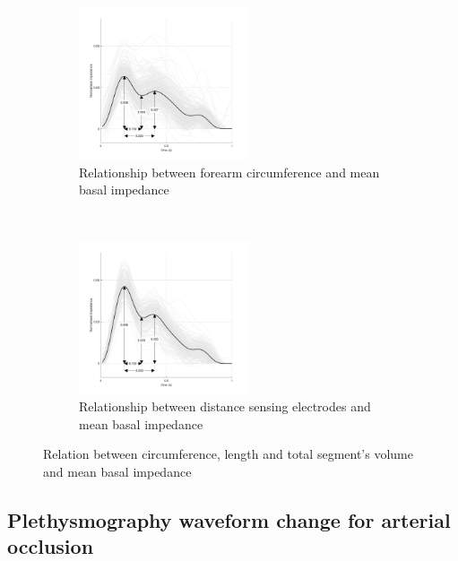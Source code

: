 \begin{figure}[t!]
	\centering
	\begin{subfigure}[t]{0.5\textwidth}
		\centering
		\includegraphics[height=4.5cm]{figure6a}
		\caption{Relationship between forearm circumference and mean basal impedance}
		\label{fig:iPG_venous_baseline}
	\end{subfigure}%
	~ 
	\begin{subfigure}[t]{0.5\textwidth}
		\centering
		\includegraphics[height=4.5cm]{figure6b}
		\caption{Relationship between distance sensing electrodes and mean basal impedance}
		\label{fig:iPG_venous_occlusion}
	\end{subfigure}
	\caption{Relation between circumference, length and total segment's volume and mean basal impedance}
	\label{fig:iPG_venous}
\end{figure}

\subsection{Plethysmography waveform change for arterial occlusion}
\label{section5.3.2}

